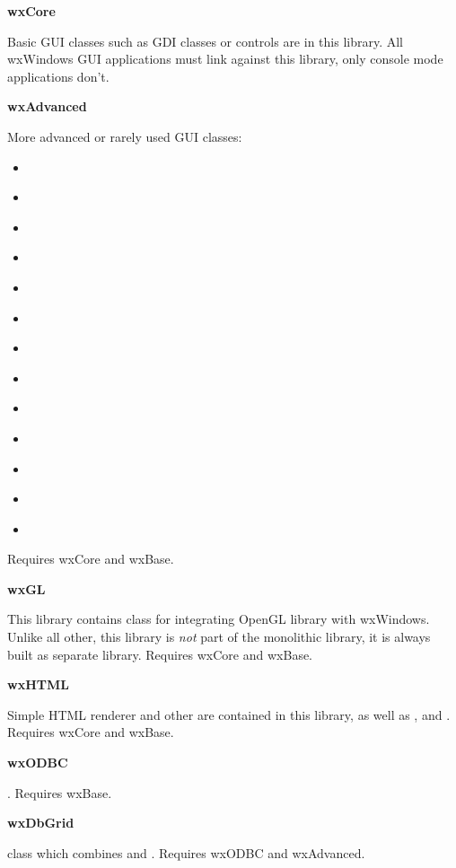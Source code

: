 {\large {\bf wxCore}}

Basic GUI classes such as GDI classes or controls are in this library. All
wxWindows GUI applications must link against this library, only console mode
applications don't.

{\large {\bf wxAdvanced}}

More advanced or rarely used GUI classes:

\begin{itemize}
\item{  }
\item{  }
\item{  }
\item{  }
\item{  }
\item{  }
\item{  }
\item{  }
\item{  }
\item{  }
\item{  }
\item{  }
\item{  }
\end{itemize}

Requires wxCore and wxBase.

{\large {\bf wxGL}}

This library contains  class for integrating
OpenGL library with wxWindows. Unlike all other, this library is {\em not}
part of the monolithic library, it is always built as separate library.
Requires wxCore and wxBase.

{\large {\bf wxHTML}}

Simple HTML renderer and other  are
contained in this library, as well as
,
 and
. Requires wxCore and wxBase.

{\large {\bf wxODBC}}

. Requires wxBase.

{\large {\bf wxDbGrid}}

 class which combines 
 and . 
Requires wxODBC and wxAdvanced.
